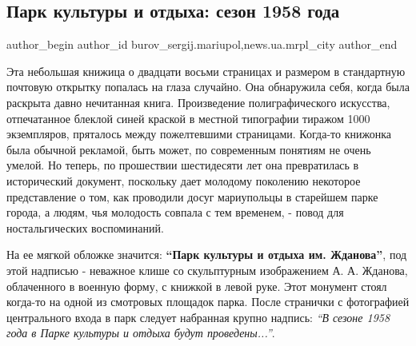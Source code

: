  
 
 
 
 
 
\subsection{Парк культуры и отдыха: сезон 1958 года}
\label{sec:09_06_2018.stz.news.ua.mrpl_city.1.park_kultury_i_otdyha_sezon_1958_goda}
 
\ifcmt
 author_begin
   author_id burov_sergij.mariupol,news.ua.mrpl_city
 author_end
\fi


Эта небольшая книжица о двадцати восьми страницах и размером в стандартную
почтовую открытку попалась на глаза случайно. Она обнаружила себя, когда была
раскрыта давно нечитанная книга. Произведение полиграфического искусства,
отпечатанное блеклой синей краской в местной типографии тиражом 1000
экземпляров, пряталось между пожелтевшими страницами. Когда-то книжонка была
обычной рекламой, быть может, по современным понятиям не очень умелой. Но
теперь, по прошествии шестидесяти лет она превратилась в исторический документ,
поскольку дает молодому поколению некоторое представление о том, как проводили
досуг мариупольцы в старейшем парке города, а людям, чья молодость совпала с
тем временем, - повод для ностальгических воспоминаний.


На ее мягкой обложке значится: \textbf{\enquote{Парк культуры и отдыха им. Жданова}}, под этой
надписью - неважное клише со скульптурным изображением А. А. Жданова,
облаченного в военную форму, с книжкой в левой руке. Этот монумент стоял
когда-то на одной из смотровых площадок парка. После странички с фотографией
центрального входа в парк следует набранная крупно надпись: \emph{\enquote{В сезоне 1958 года
в Парке культуры и отдыха будут проведены...}}.

